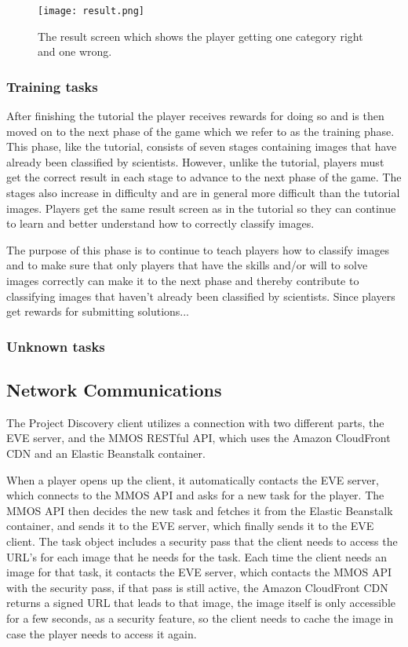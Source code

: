 		\begin{figure}[H]
		  \centering
		  \graphicspath{ {./graphics/} }
		  \centerline{\texttt{[image: result.png]}}
		  \caption{\label{fig:result}The result screen which shows the player getting one category right and one wrong.}
		\end{figure}

	\subsubsection{Training tasks}
		After finishing the tutorial the player receives rewards for doing so and is then moved on to the next phase of the game which we refer to as the training phase. This phase, like the tutorial, consists of seven stages containing images that have already been classified by scientists. However, unlike the tutorial, players must get the correct result in each stage to advance to the next phase of the game. The stages also increase in difficulty and are in general more difficult than the tutorial images. Players get the same result screen as in the tutorial so they can continue to learn and better understand how to correctly classify images. 

		The purpose of this phase is to continue to teach players how to classify images and to make sure that only players that have the skills and/or will to solve images correctly can make it to the next phase and thereby contribute to classifying images that haven't already been classified by scientists. Since players get rewards for submitting solutions...

	\subsubsection{Unknown tasks}

\subsection{Network Communications}
	The Project Discovery client utilizes a connection with two different parts, the EVE server, and the MMOS RESTful API, which uses the Amazon CloudFront CDN and an Elastic Beanstalk container.

	When a player opens up the client, it automatically contacts the EVE server, which connects to the MMOS API and asks for a new task for the player. The MMOS API then decides the new task and fetches it from the Elastic Beanstalk container, and sends it to the EVE server, which finally sends it to the EVE client. The task object includes a security pass that the client needs to access the URL's for each image that he needs for the task. Each time the client needs an image for that task, it contacts the EVE server, which contacts the MMOS API with the security pass, if that pass is still active, the Amazon CloudFront CDN returns a signed URL that leads to that image, the image itself is only accessible for a few seconds, as a security feature, so the client needs to cache the image in case the player needs to access it again.

